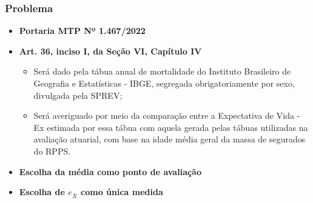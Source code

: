 \documentclass[11pt]{beamer}
\begin{document}
    \begin{frame}

        \frametitle{Problema}

        \begin{itemize}

            \item \textbf{Portaria MTP Nº 1.467/2022}
        
            \medskip

            \item \textbf{Art. 36, inciso I, da Seção VI, Capítulo IV}

                \begin{itemize}
                    \item[(a)] Será dado pela tábua anual de mortalidade do Instituto Brasileiro de Geografia e Estatísticas - IBGE, segregada obrigatoriamente por sexo, divulgada pela SPREV;
            
                    \item[(b)] Será averiguado por meio da comparação entre a Expectativa de Vida - Ex estimada por essa tábua com aquela gerada pelas tábuas utilizadas na avaliação atuarial, com base na idade média geral da massa de segurados do RPPS.
                    
                \end{itemize}

            \medskip

            \item \textbf{Escolha da média como ponto de avaliação}
            \item \textbf{Escolha de $e_{\overline{X}}$ como única medida}

            
        \end{itemize}
        
    \end{frame}
\end{document}
